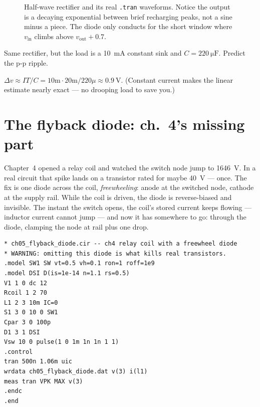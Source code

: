 \begin{figure}[htbp]
\centering

\caption{Half-wave rectifier and its real \texttt{.tran} waveforms.
Notice the output is a decaying exponential between brief recharging
peaks, not a sine minus a piece. The diode only conducts for the short
window where $v_{\mathrm{in}}$ climbs above $v_{\mathrm{out}}+0.7$.}
\label{fig:rectifier}
\end{figure}

\begin{exercise}[medium]
Same rectifier, but the load is a \qty{10}{\milli\ampere} constant sink
and $C=\qty{220}{\micro\farad}$. Predict the p-p ripple.
\begin{solution}
$\Delta v\approx IT/C=10\text{m}\cdot20\text{m}/220\mu\approx\qty{0.9}{\volt}$.
(Constant current makes the linear estimate nearly exact --- no drooping
load to save you.)
\end{solution}
\end{exercise}

\section{The flyback diode: ch.~4's missing part}\label{sec:diode-flyback}

Chapter~4 opened a relay coil and watched the switch node jump to
\qty{1646}{\volt}. In a real circuit that spike lands on a transistor
rated for maybe \qty{40}{\volt} --- once. The fix is one diode across the
coil, \emph{freewheeling}: anode at the switched node, cathode at the
supply rail. While the coil is driven, the diode is reverse-biased and
invisible. The instant the switch opens, the coil's stored current keeps
flowing --- inductor current cannot jump --- and now it has somewhere to
go: through the diode, clamping the node at rail plus one drop.

\begin{lstlisting}[caption={\ttfamily code/ch05\_flyback\_diode.cir ---
identical to ch.~4's flyback netlist except one added line: \texttt{D1 3 1
DSI}. This diode is the difference between a circuit that works and a
dead transistor.},label=lst:flybackd]
* ch05_flyback_diode.cir -- ch4 relay coil with a freewheel diode
* WARNING: omitting this diode is what kills real transistors.
.model SW1 SW vt=0.5 vh=0.1 ron=1 roff=1e9
.model DSI D(is=1e-14 n=1.1 rs=0.5)
V1 1 0 dc 12
Rcoil 1 2 70
L1 2 3 10m IC=0
S1 3 0 10 0 SW1
Cpar 3 0 100p
D1 3 1 DSI
Vsw 10 0 pulse(1 0 1m 1n 1n 1 1)
.control
tran 500n 1.06m uic
wrdata ch05_flyback_diode.dat v(3) i(l1)
meas tran VPK MAX v(3)
.endc
.end
\end{lstlisting}

